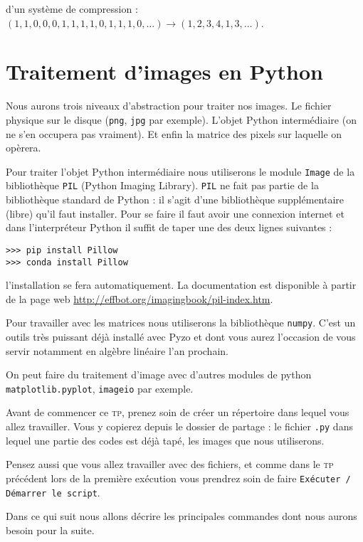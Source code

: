 \documentclass[10pt,a4paper,pdftex]{book}
\begin{document}
\ex d'un système de compression : $(1,1,0,0,0,1,1,1,1,0,1,1,1,0,\ldots)\longrightarrow (1,2,3,4,1,3,\ldots)$.


\section{Traitement d'images en Python}

Nous aurons trois niveaux d'abstraction pour traiter nos images. Le fichier physique sur le disque (\texttt{png}, \texttt{jpg} par exemple). L'\og objet Python\fg{} intermédiaire (on ne s'en occupera pas vraiment). Et enfin la matrice des pixels sur laquelle on opèrera.  

\medskip
Pour traiter l'\og objet Python intermédiaire\fg{} nous utiliserons le module \texttt{Image} de la bibliothèque \texttt{PIL} (Python Imaging Library). \verb!PIL!  ne fait pas partie de la bibliothèque standard de Python : il s'agit d'une bibliothèque supplémentaire (libre) qu'il faut installer. Pour se faire il faut avoir une connexion internet et dans l'interpréteur Python il suffit de taper une des deux lignes suivantes :
\begin{lstlisting}[style=compil]
>>> pip install Pillow
>>> conda install Pillow
\end{lstlisting}
l'installation se fera automatiquement. La documentation  est  disponible à partir de la  page web \url{http://effbot.org/imagingbook/pil-index.htm}.

\medskip
Pour travailler avec les matrices nous utiliserons la bibliothèque \texttt{numpy}. C'est un outils très puissant déjà installé avec Pyzo et dont vous aurez l'occasion de vous servir notamment en algèbre linéaire l'an prochain.

\Rq On peut faire du traitement d'image avec d'autres modules de python \texttt{matplotlib.pyplot}, \texttt{imageio} par exemple.

\medskip
Avant de commencer ce \textsc{tp}, prenez soin de créer un répertoire dans lequel vous allez travailler. Vous y copierez depuis le dossier de partage : le fichier \texttt{.py} dans lequel une partie des codes est déjà tapé, les images que nous utiliserons.

Pensez aussi que vous allez travailler avec des fichiers, et comme dans le \textsc{tp} précédent lors de la première exécution vous prendrez soin de faire \texttt{Exécuter / Démarrer le script}.

\medskip Dans ce qui suit nous allons décrire les principales commandes dont nous aurons besoin pour la suite.
\end{document}
